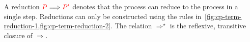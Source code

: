 \begin{definition}\label{def:cp-term-reduction-1}
  A reduction $\textcolor{red}{P}\Longrightarrow\textcolor{red}{P'}$ denotes that the process  can reduce to
  the process  in a single step. Reductions can only be constructed using
  the rules in~\cref{fig:cp-term-reduction-1,fig:cp-term-reduction-2}. 
  The relation $\Longrightarrow^\star$ is the reflexive, transitive closure of
  $\Longrightarrow$.
\end{definition}
